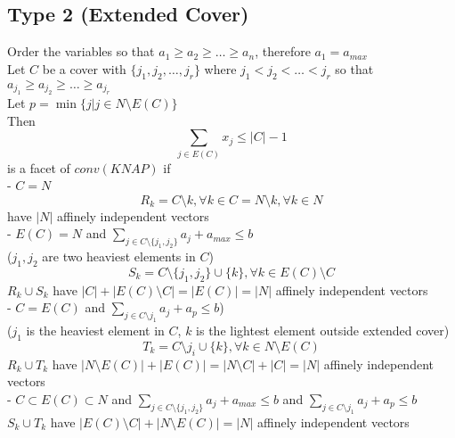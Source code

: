 				\subsection{Type 2 (Extended Cover)}
					Order the variables so that $a_1 \ge a_2 \ge \dots \ge a_n$, therefore $a_1 = a_{max}$\\
					Let $C$ be a cover with $\{j_1, j_2, \dots, j_r\}$ where $j_1 < j_2 < \dots < j_r$ so that $a_{j_1} \ge a_{j_2} \ge \dots \ge a_{j_r}$\\
					Let $p = \min\{j | j\in N \setminus E(C)\}$\\
					Then
					\begin{equation}
						\sum_{j\in E(C)} x_j \le |C| - 1 
					\end{equation}
					is a facet of $conv(KNAP)$ if\\
					- $C = N$\\
					\begin{equation}
						R_k = C\setminus k, \forall k \in C = N \setminus k, \forall k \in N 
					\end{equation}
					have $|N|$ affinely independent vectors\\
					- $E(C) = N$ and $\sum_{j\in C \setminus \{j_1, j_2\}} a_j + a_{max} \le b$\\
					 ($j_1, j_2$ are two heaviest elements in $C$)
					\begin{equation}
						S_k = C\setminus \{j_1, j_2\}\cup \{k\}, \forall k\in E(C)\setminus C 
					\end{equation}
					$R_k\cup S_k$ have $|C|+|E(C) \setminus C| = |E(C)| = |N|$ affinely independent vectors\\
					- $C = E(C)$ and $\sum_{j\in C \setminus j_1} a_j + a_p \le b$)\\
					 ($j_1$ is the heaviest element in $C$, $k$ is the lightest element outside extended cover)
					\begin{equation}
						T_k = C \setminus j_i \cup \{k\}, \forall k\in N\setminus E(C) 
					\end{equation}
					$R_k \cup T_k$ have $|N \setminus E(C)| + |E(C)| = |N\setminus C| + |C| = |N|$ affinely independent vectors\\
					- $C \subset E(C) \subset N$ and $\sum_{j\in C \setminus \{j_1, j_2\}} a_j + a_{max} \le b$ and $\sum_{j\in C \setminus j_1} a_j + a_p \le b$\\
					$S_k \cup T_k$ have $|E(C) \setminus C| + |N \setminus E(C)| = |N|$ affinely independent vectors


